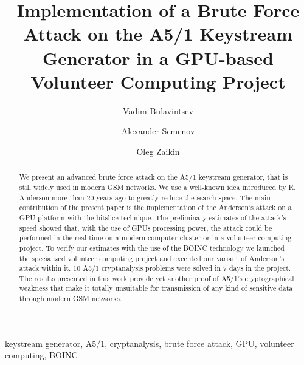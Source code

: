 \documentclass[runningheads,a4paper]{llncs}[2015/06/24]
\begin{document}
\title{Implementation of a Brute Force Attack on the A5/1 Keystream Generator
in a GPU-based Volunteer Computing Project}

\author{Vadim Bulavintsev \and Alexander Semenov \and Oleg Zaikin}

%

			
\maketitle

\begin{abstract}
We present an advanced brute force attack on the A5/1 keystream generator,
	that is still widely used in modern GSM networks. We use a
	well-known idea introduced by R. Anderson more than 20 years ago
	to greatly reduce the search space. The main contribution of
	the present paper is the implementation of the Anderson's attack on a GPU platform
	with the bitslice technique. The preliminary estimates of the
	attack's speed showed that, with the use of GPUs processing power, 
	the attack could be performed in the real time on a modern computer cluster or in a volunteer computing
	project. To verify our estimates with the use of the BOINC technology 
	we launched the specialized volunteer computing project 
	and executed our variant of Anderson's attack within it. 10 A5/1 cryptanalysis problems were
	solved in 7 days in the project. The results presented in this work provide yet another
	proof of A5/1's cryptographical weakness that make it totally
	unsuitable for transmission of any kind of sensitive data
	through modern GSM networks.

\end{abstract}

\begin{keywords}
keystream generator, A5/1, cryptanalysis, brute force attack, GPU, volunteer computing, BOINC
\end{keywords}
\end{document}
